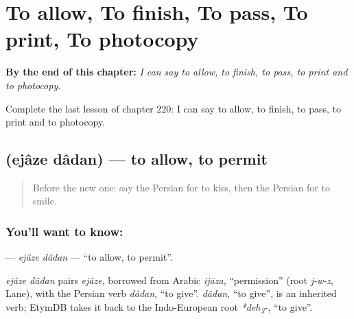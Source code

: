 
\chapter{To allow, To finish, To pass, To print, To photocopy}
\label{ch:fa-to-allow-to-finish-to-pass-to-print-to-photocopy}

\begin{chapteropening}
\textbf{By the end of this chapter:} \emph{I can say to allow, to finish, to pass, to print and to photocopy.}

Complete the last lesson of chapter 220: I can say to allow, to finish, to pass, to print and to photocopy.
\end{chapteropening}

\section[\texorpdfstring{\fa{اجازه} \fa{دادن} (ejâze dâdan)}{اجازه دادن (ejâze dâdan)}]{  (ejâze dâdan) — to allow, to permit}

\label{lesson:FA-C220-ejaze-dadan}



\begin{quote}
Before the new one: say the Persian for to kiss, then the Persian for to smile.
\end{quote}

\subsection*{You'll want to know:  }
\textbf{ } — \emph{ejâze dâdan} — \textquotedblleft{}to allow, to permit\textquotedblright{}.

\begin{cousinweb}
\emph{ejâze dâdan} pairs \emph{ejâze}, borrowed from Arabic \emph{ijāza}, \textquotedblleft{}permission\textquotedblright{} (root \emph{j-w-z}, Lane), with the Persian verb \emph{dâdan}, \textquotedblleft{}to give\textquotedblright{}. \emph{dâdan}, \textquotedblleft{}to give\textquotedblright{}, is an inherited verb; EtymDB takes it back to the Indo-European root \emph{*deh\textsubscript{3}-}, \textquotedblleft{}to give\textquotedblright{}.
\end{cousinweb}

